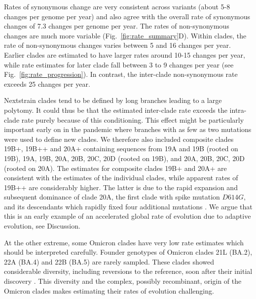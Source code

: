 \documentclass[aps,rmp, twocolumn]{revtex4}
\begin{document}
Rates of synonymous change are very consistent across variants (about 5-8 changes per genome per year) and also agree with the overall rate of synonymous changes of 7.3 changes per genome per year.
The rates of non-synonymous changes are much more variable (Fig.~\ref{fig:rate_summary}D).
Within clades, the rate of non-synonymous changes varies between 5 and 16 changes per year.
Earlier clades are estimated to have larger rates around 10-15 changes per year, while rate estimates for later clade fall  between 3 to 9 changes per year (see Fig.~\ref{fig:rate_progression}).
In contrast, the inter-clade non-synonymous rate exceeds 25 changes per year.

Nextstrain clades tend to be defined by long branches leading to a large polytomy.
It could thus be that the estimated inter-clade rate exceeds the intra-clade rate purely because of this conditioning.
This effect might be particularly important early on in the pandemic where branches with as few as two mutations were used to define new clades.
We therefore also included composite clades 19B+, 19B++ and 20A+ containing sequences from 19A and 19B (rooted on 19B), 19A, 19B, 20A, 20B, 20C, 20D (rooted on 19B), and 20A, 20B, 20C, 20D (rooted on 20A).
The estimates for composite clades 19B+ and 20A+ are consistent with the estimates of the individual clades, while apparent rates of 19B++ are considerably higher.
The latter is due to the rapid expansion and subsequent dominance of clade 20A, the first clade with spike mutation $D614G$, and its descendants which rapidly fixed four additional mutations \citep{korber_tracking_2020}.
We argue that this is an early example of an accelerated global rate of evolution due to adaptive evolution, see Discussion.

At the other extreme, some Omicron clades have very low rate estimates which should be interpreted carefully.
Founder genotypes of Omicron clades 21L (BA.2), 22A (BA.4) and 22B (BA.5) are rarely sampled.
These clades showed considerable diversity, including reversions to the reference, soon after their initial discovery \citep{tegally_emergence_2022}.
This diversity and the complex, possibly recombinant, origin of the Omicron clades makes estimating their rates of evolution challenging.
\end{document}
